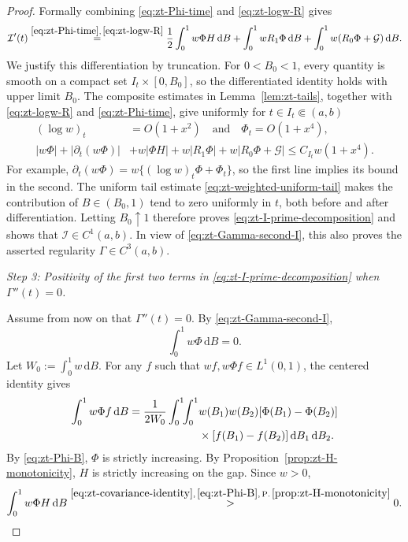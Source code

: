 \documentclass[10pt]{amsart}
\theoremstyle{definition}
\theoremstyle{remark}
\numberwithin{equation}{section}
\newcommand{\1}{\mathbf 1}
\newcommand{\cI}{\mathcal I}
\newcommand{\cG}{\mathcal G}
\newcommand{\dd}{\,\mathrm d}
\newcommand{\stackref}[2]{\stackrel{#2}{#1}}
\begin{document}
\begin{proof}
Formally combining \eqref{eq:zt-Phi-time} and \eqref{eq:zt-logw-R} gives
\begin{equation}
 \cI'(t)
 \stackref{=}{\eqref{eq:zt-Phi-time},\,\eqref{eq:zt-logw-R}}
 \frac12\int_0^1w\Phi H\dd B
 +\int_0^1wR_1\Phi\dd B
 +\int_0^1w(R_0\Phi+\cG)\dd B.
 \label{eq:zt-I-prime-decomposition}
\end{equation}
We justify this differentiation by truncation.  For $0<B_0<1$, every quantity is smooth on a compact set $I_t\times[0,B_0]$, so the differentiated identity holds with upper limit $B_0$.  The composite estimates in Lemma~\ref{lem:zt-tails}, together with \eqref{eq:zt-logw-R} and \eqref{eq:zt-Phi-time}, give uniformly for $t\in I_t\Subset(a,b)$
\begin{align*}
 (\log w)_t&=O(1+x^2)\quad\text{and}\quad \Phi_t=O(1+x^4),\\
 |w\Phi|+|\partial_t(w\Phi)|
 &+w|\Phi H|+w|R_1\Phi|+w|R_0\Phi+\cG|
 \leq C_{I_t}w(1+x^4).
\end{align*}
For example, $\partial_t(w\Phi)=w\{(\log w)_t\Phi+\Phi_t\}$, so the first line implies its bound in the second.  The uniform tail estimate \eqref{eq:zt-weighted-uniform-tail} makes the contribution of $B\in(B_0,1)$ tend to zero uniformly in $t$, both before and after differentiation.  Letting $B_0\uparrow1$ therefore proves \eqref{eq:zt-I-prime-decomposition} and shows that $\cI\in C^1(a,b)$. In view of \eqref{eq:zt-Gamma-second-I}, this also proves the asserted regularity $\Gamma\in C^3(a,b)$.

\smallskip
\noindent\emph{Step 3: Positivity of the first two terms in \eqref{eq:zt-I-prime-decomposition} when $\Gamma''(t)=0$.}

Assume from now on that $\Gamma''(t)=0$.  By \eqref{eq:zt-Gamma-second-I},
\begin{equation}
 \int_0^1w\Phi\dd B=0.
 \label{eq:zt-Phi-centered}
\end{equation}
Let $W_0:=\int_0^1w\dd B$.  For any $f$ such that $wf,w\Phi f\in L^1(0,1)$, the centered identity gives
\begin{align}
 \int_0^1w\Phi f\dd B
 =\frac1{2W_0}\int_0^1\!\!\int_0^1
 &w(B_1)w(B_2)[\Phi(B_1)-\Phi(B_2)] \notag\\
 &\times[f(B_1)-f(B_2)]\dd B_1\dd B_2.                       \label{eq:zt-covariance-identity}
\end{align}
By \eqref{eq:zt-Phi-B}, $\Phi$ is strictly increasing. By Proposition~\ref{prop:zt-H-monotonicity}, $H$ is strictly increasing on the gap. Since $w>0$,
\begin{equation}
 \int_0^1w\Phi H\dd B
 \stackref{>}{\eqref{eq:zt-covariance-identity},\,\eqref{eq:zt-Phi-B},\,\mathrm{P.\,\ref{prop:zt-H-monotonicity}}}0.
 \label{eq:zt-H-term-positive}
\end{equation}


\end{proof}
\end{document}
